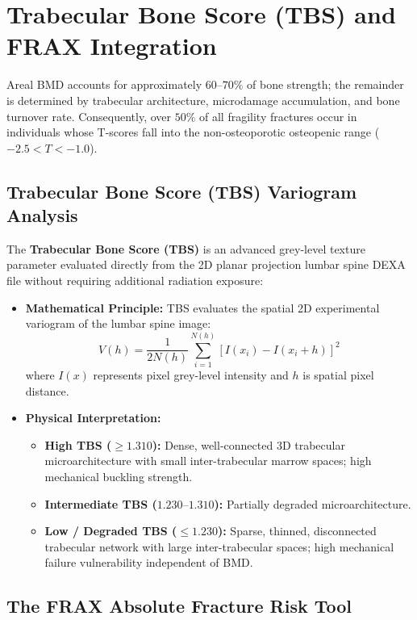 \documentclass[11pt,a4paper]{article}
\begin{document}
\newpage
\section{Trabecular Bone Score (TBS) and FRAX Integration}

Areal BMD accounts for approximately $60\text{--}70\%$ of bone strength; the remainder is determined by trabecular architecture, microdamage accumulation, and bone turnover rate. Consequently, over $50\%$ of all fragility fractures occur in individuals whose T-scores fall into the non-osteoporotic osteopenic range ($-2.5 < T < -1.0$).

\subsection{Trabecular Bone Score (TBS) Variogram Analysis}

The \textbf{Trabecular Bone Score (TBS)} is an advanced grey-level texture parameter evaluated directly from the 2D planar projection lumbar spine DEXA file without requiring additional radiation exposure:
\begin{itemize}[leftmargin=*]
    \item \textbf{Mathematical Principle:} TBS evaluates the spatial 2D experimental variogram of the lumbar spine image:
    \begin{equation}
        V(h) = \frac{1}{2 N(h)} \sum_{i=1}^{N(h)} \left[ I(x_i) - I(x_i + h) \right]^2
    \end{equation}
    where $I(x)$ represents pixel grey-level intensity and $h$ is spatial pixel distance.
    \item \textbf{Physical Interpretation:}
    \begin{itemize}
        \item \textbf{High TBS ($\ge 1.310$):} Dense, well-connected 3D trabecular microarchitecture with small inter-trabecular marrow spaces; high mechanical buckling strength.
        \item \textbf{Intermediate TBS ($1.230\text{--}1.310$):} Partially degraded microarchitecture.
        \item \textbf{Low / Degraded TBS ($\le 1.230$):} Sparse, thinned, disconnected trabecular network with large inter-trabecular spaces; high mechanical failure vulnerability independent of BMD.
    \end{itemize}
\end{itemize}

\subsection{The FRAX Absolute Fracture Risk Tool}
\end{document}

